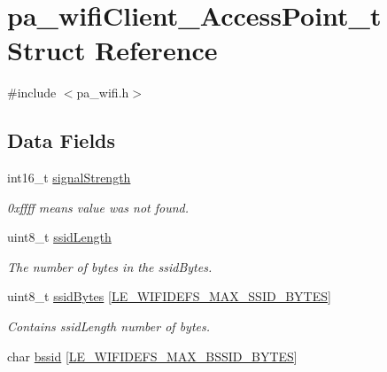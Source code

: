 \hypertarget{structpa__wifi_client___access_point__t}{}\section{pa\+\_\+wifi\+Client\+\_\+\+Access\+Point\+\_\+t Struct Reference}
\label{structpa__wifi_client___access_point__t}


{\ttfamily \#include $<$pa\+\_\+wifi.\+h$>$}

\subsection*{Data Fields}
\begin{DoxyCompactItemize}
\item 
int16\+\_\+t \hyperlink{structpa__wifi_client___access_point__t_ab90c934c220c7ee22f20ac8bb1067dbf}{signal\+Strength}\hypertarget{structpa__wifi_client___access_point__t_ab90c934c220c7ee22f20ac8bb1067dbf}{}\label{structpa__wifi_client___access_point__t_ab90c934c220c7ee22f20ac8bb1067dbf}

\begin{DoxyCompactList}\small\item\em 0xffff means value was not found. \end{DoxyCompactList}\item 
uint8\+\_\+t \hyperlink{structpa__wifi_client___access_point__t_a58dc48bb34bb5bb57460b29c20612e84}{ssid\+Length}\hypertarget{structpa__wifi_client___access_point__t_a58dc48bb34bb5bb57460b29c20612e84}{}\label{structpa__wifi_client___access_point__t_a58dc48bb34bb5bb57460b29c20612e84}

\begin{DoxyCompactList}\small\item\em The number of bytes in the ssid\+Bytes. \end{DoxyCompactList}\item 
uint8\+\_\+t \hyperlink{structpa__wifi_client___access_point__t_a94c7b740ceb19475fc8a5014d45c4dc8}{ssid\+Bytes} \mbox{[}\hyperlink{le__wifi_defs__interface_8h_abba88ade60f4a8508fd8a1db0e1f9bc0}{L\+E\+\_\+\+W\+I\+F\+I\+D\+E\+F\+S\+\_\+\+M\+A\+X\+\_\+\+S\+S\+I\+D\+\_\+\+B\+Y\+T\+ES}\mbox{]}\hypertarget{structpa__wifi_client___access_point__t_a94c7b740ceb19475fc8a5014d45c4dc8}{}\label{structpa__wifi_client___access_point__t_a94c7b740ceb19475fc8a5014d45c4dc8}

\begin{DoxyCompactList}\small\item\em Contains ssid\+Length number of bytes. \end{DoxyCompactList}\item 
char \hyperlink{structpa__wifi_client___access_point__t_aab0cb346c9fad269aa5bd07bd33a4beb}{bssid} \mbox{[}\hyperlink{le__wifi_defs__interface_8h_aaf0dc3d2b7e5d8d1a29837cc55968751}{L\+E\+\_\+\+W\+I\+F\+I\+D\+E\+F\+S\+\_\+\+M\+A\+X\+\_\+\+B\+S\+S\+I\+D\+\_\+\+B\+Y\+T\+ES}\mbox{]}\hypertarget{structpa__wifi_client___access_point__t_aab0cb346c9fad269aa5bd07bd33a4beb}{}\label{structpa__wifi_client___access_point__t_aab0cb346c9fad269aa5bd07bd33a4beb}


\end{DoxyCompactItemize}
